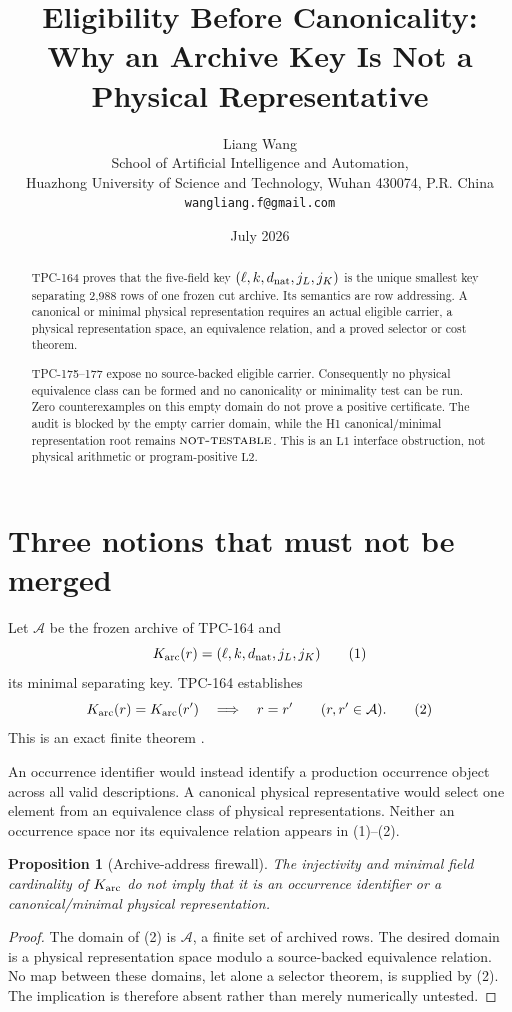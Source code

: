 \documentclass[11pt]{article}
\title{\textbf{Eligibility Before Canonicality:}\\
\textbf{Why an Archive Key Is Not a Physical Representative}}
\author{Liang Wang\\
School of Artificial Intelligence and Automation,\\
Huazhong University of Science and Technology, Wuhan 430074, P.R. China\\
\texttt{wangliang.f@gmail.com}}
\date{July 2026}
\newtheorem{proposition}[theorem]{Proposition}
\theoremstyle{definition}
\theoremstyle{remark}
\newcommand{\Lone}{\mathrm{L1}}
\newcommand{\Ltwo}{\mathrm{L2}}
\newcommand{\NT}{\textnormal{\textsc{not-testable}}}
\begin{document}
\maketitle

\begin{abstract}
TPC-164 proves that the five-field key
\((\ell,k,d_{\rm nat},j_L,j_K)\) is the unique smallest key
separating 2,988 rows of one frozen cut archive.  Its semantics are
row addressing.  A canonical or minimal physical representation
requires an actual eligible carrier, a physical representation
space, an equivalence relation, and a proved selector or cost
theorem.

TPC-175--177 expose no source-backed eligible carrier.  Consequently
no physical equivalence class can be formed and no canonicality or
minimality test can be run.  Zero counterexamples on this empty
domain do not prove a positive certificate.  The audit is blocked by
the empty carrier domain, while the H1 canonical/minimal
representation root remains \(\NT\).  This is an \(\Lone\)
interface obstruction, not physical arithmetic or program-positive
\(\Ltwo\).
\end{abstract}

\section{Three notions that must not be merged}

Let \(\mathcal A\) be the frozen archive of TPC-164 and
\[
 K_{\rm arc}(r)=(\ell,k,d_{\rm nat},j_L,j_K)                       \tag{1}
\]
its minimal separating key.  TPC-164 establishes
\[
 K_{\rm arc}(r)=K_{\rm arc}(r')\quad\Longrightarrow\quad r=r'
 \qquad(r,r'\in\mathcal A).                                      \tag{2}
\]
This is an exact finite theorem \cite{WangTPC164}.

An occurrence identifier would instead identify a production
occurrence object across all valid descriptions.  A canonical
physical representative would select one element from an equivalence
class of physical representations.  Neither an occurrence space nor
its equivalence relation appears in (1)--(2).

\begin{proposition}[Archive-address firewall]
The injectivity and minimal field cardinality of \(K_{\rm arc}\) do
not imply that it is an occurrence identifier or a canonical/minimal
physical representation.
\end{proposition}

\begin{proof}
The domain of (2) is \(\mathcal A\), a finite set of archived rows.
The desired domain is a physical representation space modulo a
source-backed equivalence relation.  No map between these domains,
let alone a selector theorem, is supplied by (2).  The implication is
therefore absent rather than merely numerically untested.
\end{proof}
\end{document}
